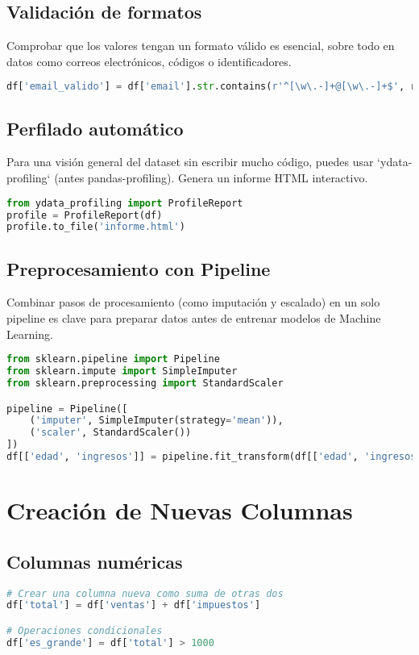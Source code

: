 \documentclass[11pt]{article}
\begin{document}
\subsection*{Validación de formatos}
Comprobar que los valores tengan un formato válido es esencial, sobre todo en datos como correos electrónicos, códigos o identificadores.

\begin{lstlisting}[language=Python]
df['email_valido'] = df['email'].str.contains(r'^[\w\.-]+@[\w\.-]+$', regex=True)
\end{lstlisting}

\subsection*{Perfilado automático}
Para una visión general del dataset sin escribir mucho código, puedes usar `ydata-profiling` (antes pandas-profiling). Genera un informe HTML interactivo.

\begin{lstlisting}[language=Python]
from ydata_profiling import ProfileReport
profile = ProfileReport(df)
profile.to_file('informe.html')
\end{lstlisting}

\subsection*{Preprocesamiento con Pipeline}
Combinar pasos de procesamiento (como imputación y escalado) en un solo pipeline es clave para preparar datos antes de entrenar modelos de Machine Learning.

\begin{lstlisting}[language=Python]
from sklearn.pipeline import Pipeline
from sklearn.impute import SimpleImputer
from sklearn.preprocessing import StandardScaler

pipeline = Pipeline([
    ('imputer', SimpleImputer(strategy='mean')),
    ('scaler', StandardScaler())
])
df[['edad', 'ingresos']] = pipeline.fit_transform(df[['edad', 'ingresos']])
\end{lstlisting}

\section*{Creación de Nuevas Columnas}

\subsection*{Columnas numéricas}
\begin{lstlisting}[language=Python]
# Crear una columna nueva como suma de otras dos
df['total'] = df['ventas'] + df['impuestos']

# Operaciones condicionales
df['es_grande'] = df['total'] > 1000
\end{lstlisting}
\end{document}
